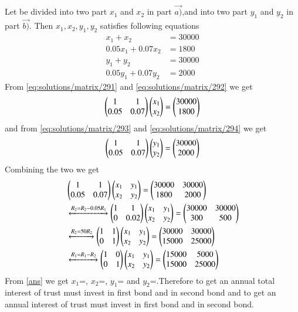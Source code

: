Let  be divided into two part $x_1$ and $x_2$ in part $\vec{a)}$,and into two part $y_1$ and $y_2$ in part $\vec{b)}$. Then $x_1,x_2,y_1,y_2$ satisfies following equations
\begin{align}
  x_1+x_2 &= 30000\label{eq:solutions/matrix/291}\\
  0.05x_1+0.07x_2 &= 1800\label{eq:solutions/matrix/292}\\
  y_1+y_2 &= 30000\label{eq:solutions/matrix/293}\\
  0.05y_1+0.07y_2 &= 2000\label{eq:solutions/matrix/294}
\end{align}
From \eqref{eq:solutions/matrix/291} and \eqref{eq:solutions/matrix/292} we get
\begin{align}
  \begin{pmatrix}1&1\\0.05&0.07\end{pmatrix}\begin{pmatrix}x_1\\x_2\end{pmatrix} = \begin{pmatrix}30000\\1800\end{pmatrix}
\end{align}
and from \eqref{eq:solutions/matrix/293} and \eqref{eq:solutions/matrix/294} we get
\begin{align}
  \begin{pmatrix}1&1\\0.05&0.07\end{pmatrix}\begin{pmatrix}y_1\\y_2\end{pmatrix} = \begin{pmatrix}30000\\2000\end{pmatrix}
\end{align}
Combining the two we get
\begin{align}
  &\begin{pmatrix}1&1\\0.05&0.07\end{pmatrix}\begin{pmatrix}x_1&y_1\\x_2&y_2\end{pmatrix} = \begin{pmatrix}30000&30000\\1800&2000\end{pmatrix} \nonumber \\
  &\xleftrightarrow{R_2 = R_2 - 0.05 R_1}\begin{pmatrix}1&1\\0&0.02\end{pmatrix}\begin{pmatrix}x_1&y_1\\x_2&y_2\end{pmatrix} = \begin{pmatrix}30000&30000\\300&500\end{pmatrix} \nonumber \\
  &\xleftrightarrow{R_2 = 50R_2}\begin{pmatrix}1&1\\0&1\end{pmatrix}\begin{pmatrix}x_1&y_1\\x_2&y_2\end{pmatrix} = \begin{pmatrix}30000&30000\\15000&25000\end{pmatrix} \nonumber \\
  &\xleftrightarrow{R_1 = R_1-R_2}\begin{pmatrix}1&0\\0&1\end{pmatrix}\begin{pmatrix}x_1&y_1\\x_2&y_2\end{pmatrix} = \begin{pmatrix}15000&5000\\15000&25000\end{pmatrix}\label{ans}
\end{align}
From \eqref{ans} we get $x_1$=, $x_2$=, $y_1$= and $y_2$=.Therefore to get an annual total interest of  trust must invest  in first bond and  in second bond and to get an annual interest of  trust must invest  in first bond and  in second bond.
